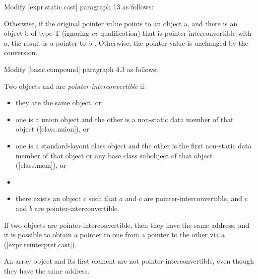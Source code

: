 Modify [expr.static.cast] paragraph 13 as follows:

\begin{adjustwidth}{0.5cm}{0.5cm}
Otherwise, if the original pointer value points to an object a, and there is an object b of type T (ignoring \emph{cv}-qualification) that is pointer-interconvertible with a, the result is a pointer to b . Otherwise, the pointer value is unchanged by the conversion.
\end{adjustwidth}

Modify [basic.compound] paragraph 4.3 as follows:

\begin{adjustwidth}{0.5cm}{0.5cm}
Two objects  and  are \emph{pointer-interconvertible} if:

\begin{itemize}
  \item they are the same object, or
  \item one is a union object and the other is a non-static data member of that object ([class.union]), or
  \item one is a standard-layout class object and the other is the first non-static data member of that object or any base class subobject of that object ([class.mem]), or
  \item {}
  \item there exists an object $c$ such that $a$ and $c$ are pointer-interconvertible, and $c$ and $b$ are pointer-interconvertible.
\end{itemize}

If two objects are pointer-interconvertible, then they have the same address, and it is possible to obtain a pointer to one from a pointer to the other via a  ([expr.reinterpret.cast]).

\begin{note}
An array object and its first element are not pointer-interconvertible, even though they have the same address.
\end{note}
\end{adjustwidth}


